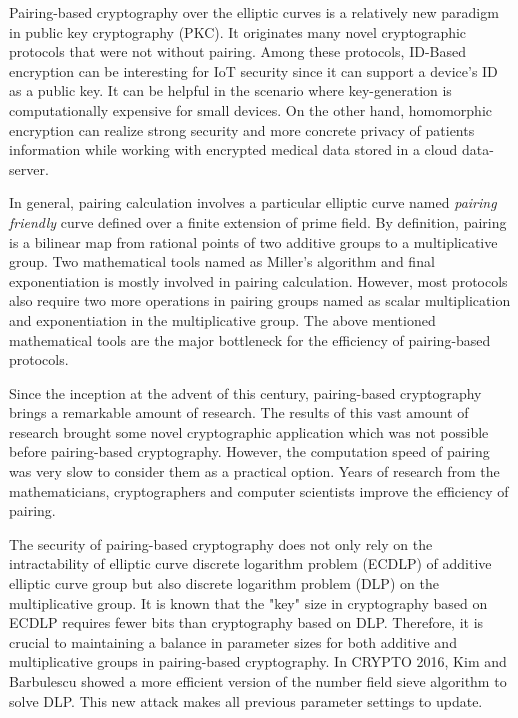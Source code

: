 Pairing-based cryptography over the elliptic curves is a relatively new paradigm in public key cryptography (PKC). 
It originates many novel cryptographic protocols that were not without pairing. Among these protocols, ID-Based encryption can be interesting for IoT security since it can support a device's ID as a public key.
It can be helpful in the scenario where key-generation is computationally expensive for small devices.
On the other hand, homomorphic encryption can realize strong security and more concrete privacy of patients information while working with encrypted medical data stored in a cloud data-server.

In general, pairing calculation involves a particular elliptic curve named \textit{pairing friendly} curve defined over a finite extension of prime field.
By definition, pairing is a bilinear map from rational points of two additive groups to a multiplicative group.
Two mathematical tools named as Miller's algorithm and final exponentiation is mostly involved in pairing calculation.
However, most protocols also require two more operations in pairing groups named as scalar multiplication and exponentiation in the multiplicative group.
The above mentioned mathematical tools are the major bottleneck for the efficiency of pairing-based protocols.

Since the inception at the advent of this century, pairing-based cryptography brings a remarkable amount of research. 
The results of this vast amount of research brought some novel cryptographic application which was not possible before pairing-based cryptography. 
However, the computation speed of pairing was very slow to consider them as a practical option.
Years of research from the mathematicians, cryptographers and computer scientists improve the efficiency of pairing.

The security of pairing-based cryptography does not only rely on the intractability of elliptic curve discrete logarithm problem (ECDLP) of additive elliptic curve group but also discrete logarithm problem (DLP) on the multiplicative group.
It is known that the "key" size in cryptography based on ECDLP requires fewer bits than cryptography based on DLP.
Therefore, it is crucial to maintaining a balance in parameter sizes for both additive and multiplicative groups in pairing-based cryptography.
In CRYPTO 2016, Kim and Barbulescu showed a more efficient version of the number field sieve algorithm to solve DLP. 
This new attack makes all previous parameter settings to update.

